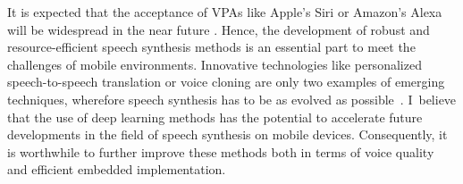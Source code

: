 It is expected that the acceptance of \acp{VPA} like Apple's Siri or Amazon's Alexa will be widespread in the near future \cite{gartner:assistants}. Hence, the development of robust and resource-efficient speech synthesis methods is an essential part to meet the challenges of mobile environments. Innovative technologies like personalized speech-to-speech translation or voice cloning are only two examples of emerging techniques, wherefore speech synthesis has to be as evolved as possible~\cite{edinburgh:speech}. I~believe that the use of deep learning methods has the potential to accelerate future developments in the field of speech synthesis on mobile devices. Consequently, it is worthwhile to further improve these methods both in terms of voice quality and efficient embedded implementation. %